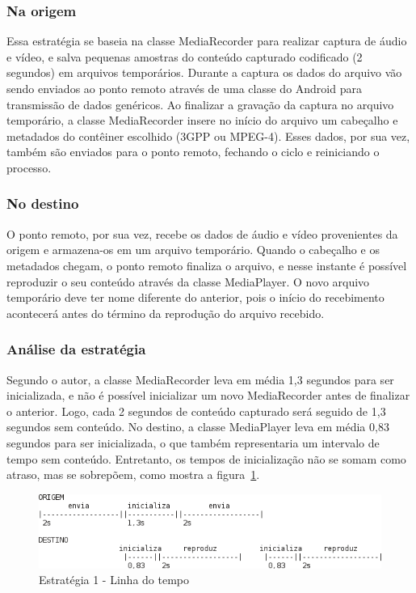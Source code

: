 \documentclass{acm_proc_article-sp}
\begin{document}
\subsubsection{Na origem}

Essa estratégia se baseia na classe MediaRecorder para realizar captura de áudio e vídeo, e salva pequenas amostras do conteúdo capturado codificado (2 segundos) em arquivos temporários. Durante a captura os dados do arquivo vão sendo enviados ao ponto remoto através de uma classe do Android para transmissão de dados genéricos. Ao finalizar a gravação da captura no arquivo temporário, a classe MediaRecorder insere no início do arquivo um cabeçalho e metadados do contêiner escolhido (3GPP ou MPEG-4). Esses dados, por sua vez, também são enviados para o ponto remoto, fechando o ciclo e reiniciando o processo.

\subsubsection{No destino}

O ponto remoto, por sua vez, recebe os dados de áudio e vídeo provenientes da origem e armazena-os em um arquivo temporário. Quando o cabeçalho e os metadados chegam, o ponto remoto finaliza o arquivo, e nesse instante é possível reproduzir o seu conteúdo através da classe MediaPlayer. O novo arquivo temporário deve ter nome diferente do anterior, pois o início do recebimento acontecerá antes do término da reprodução do arquivo recebido.

\subsubsection{Análise da estratégia}

Segundo o autor, a classe MediaRecorder leva em média 1,3 segundos para ser inicializada, e não é possível inicializar um novo MediaRecorder antes de finalizar o anterior. Logo, cada 2 segundos de conteúdo capturado será seguido de 1,3 segundos sem conteúdo. No destino, a classe MediaPlayer leva em média 0,83 segundos para ser inicializada, o que também representaria um intervalo de tempo sem conteúdo. Entretanto, os tempos de inicialização não se somam como atraso, mas se sobrepõem, como mostra a figura~\ref{figura_estrategia1}.

\begin{figure}[htp]
 \centering
 \includegraphics[scale=0.7]{./estrategia1.png}
\caption{Estratégia 1 - Linha do tempo}\label{figura_estrategia1}
\end{figure}
\end{document}
